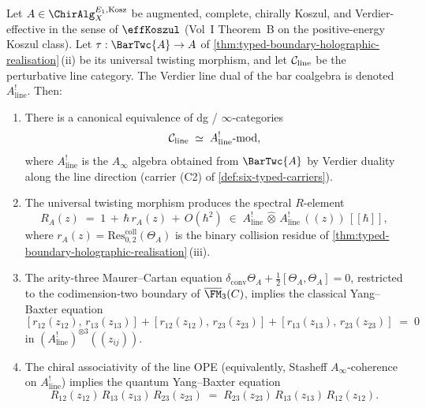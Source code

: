 \begin{theorem}%
\label{thm:line-operators-koszul-dual-modules-spectral-R}%
%
%
%
Let $A \in \ChirAlg_{X}^{E_{1},\mathrm{Kosz}}$ be augmented,
complete, chirally Koszul, and Verdier-effective in the sense of
$\effKoszul$ \textup{(}Vol~I Theorem~B on the positive-energy Koszul
class\textup{)}. Let
$\tau : \BarTwc{A} \to A$ of
\cref{thm:typed-boundary-holographic-realisation}\,(ii) be its
universal twisting morphism, and let $\mathcal C_{\mathrm{line}}$ be the
perturbative line category. The Verdier line dual of the bar coalgebra
is denoted $A^{!}_{\mathrm{line}}$. Then:
\begin{enumerate}[label=\textup{(\alph*)}]
\item There is a canonical equivalence of dg / $\infty$-categories
\begin{equation}\label{eq:line-as-Akoszul-mod}
 \mathcal C_{\mathrm{line}}
 \;\simeq\;
 A^{!}_{\mathrm{line}}\text{-}\mathrm{mod},
\end{equation}
where $A^{!}_{\mathrm{line}}$ is the $A_{\infty}$ algebra obtained from
$\BarTwc{A}$ by Verdier duality along the line direction (carrier
\textup{(C2)} of \cref{def:six-typed-carriers}).
\item The universal twisting morphism produces the spectral
$R$-element
\begin{equation}\label{eq:spectral-R-from-tau}
 R_{A}(z) \;=\; 1 \,+\, \hbar\,r_{A}(z) \,+\, O(\hbar^{2})
 \;\in\;
 A^{!}_{\mathrm{line}} \,\widehat{\otimes}\, A^{!}_{\mathrm{line}}
 \,(\!(z)\!)\,[\![\hbar]\!],
\end{equation}
where $r_{A}(z) = \mathrm{Res}^{\mathrm{coll}}_{0,2}(\Theta_{A})$ is the
binary collision residue of
\cref{thm:typed-boundary-holographic-realisation}\,(iii).
\item The arity-three Maurer--Cartan equation
$\delta_{\mathrm{conv}}\Theta_{A} +
\tfrac{1}{2}[\Theta_{A}, \Theta_{A}] = 0$, restricted to the
codimension-two boundary of $\overline{\FM}_{3}(C)$, implies the
classical Yang--Baxter equation
\begin{equation}\label{eq:CYBE-from-MC-arity3}
 [r_{12}(z_{12}),\, r_{13}(z_{13})]
 + [r_{12}(z_{12}),\, r_{23}(z_{23})]
 + [r_{13}(z_{13}),\, r_{23}(z_{23})]
 \;=\; 0
\end{equation}
in $(A^{!}_{\mathrm{line}})^{\otimes 3}(\!(z_{ij})\!)$.
\item The chiral associativity of the line OPE \textup(equivalently,
Stasheff $A_{\infty}$-coherence on $A^{!}_{\mathrm{line}}$\textup)
implies the quantum Yang--Baxter equation
\begin{equation}\label{eq:QYBE-from-line-associativity}
 R_{12}(z_{12})\,R_{13}(z_{13})\,R_{23}(z_{23})
 \;=\;
 R_{23}(z_{23})\,R_{13}(z_{13})\,R_{12}(z_{12}).
\end{equation}
\end{enumerate}
\end{theorem}

